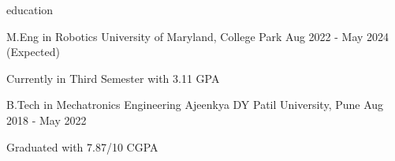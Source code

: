 \begin{section}{education}

  \begin{school}
    {M.Eng in Robotics}
    {University of Maryland, College Park}
    {Aug 2022 - May 2024 (Expected)}
    
    \item Currently in Third Semester with 3.11 GPA

  \end{school}

  \begin{school}
    {B.Tech in Mechatronics Engineering}
    {Ajeenkya DY Patil University, Pune}
    {Aug 2018 - May 2022}

    \item Graduated with 7.87/10 CGPA

  \end{school}

\end{section}
